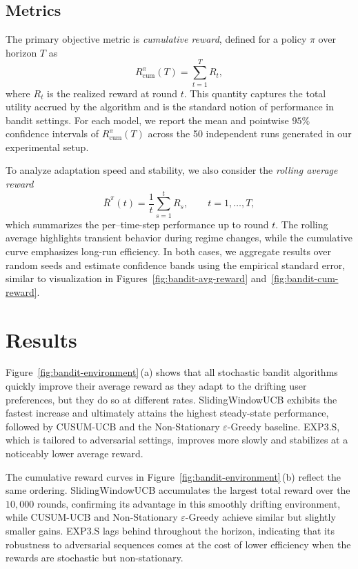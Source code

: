 \documentclass[pdflatex,sn-mathphys-num]{sn-jnl}
\theoremstyle{thmstyleone}%
\theoremstyle{thmstyletwo}%
\theoremstyle{thmstylethree}%
\begin{document}
\FloatBarrier

\subsection{Metrics}\label{sec3-3}

The primary objective metric is \emph{cumulative reward}, defined for a policy
\(\pi\) over horizon \(T\) as
\[
R_{\text{cum}}^\pi(T)
=
\sum_{t=1}^{T} R_t,
\]
where \(R_t\) is the realized reward at round \(t\). This quantity captures the
total utility accrued by the algorithm and is the standard notion of
performance in bandit settings. For each model, we report the mean and
pointwise \(95\%\) confidence intervals of \(R_{\text{cum}}^\pi(T)\) across the
50 independent runs generated in our experimental setup.\cite{swucb,epsilon_greedy_ns,cusumucb,exp3s}

To analyze adaptation speed and stability, we also consider the \emph{rolling
average reward}
\[
\bar{R}^\pi(t)
=
\frac{1}{t}\sum_{s=1}^{t} R_s,
\qquad t = 1,\dots,T,
\]
which summarizes the per–time-step performance up to round \(t\). The rolling
average highlights transient behavior during regime changes, while the
cumulative curve emphasizes long-run efficiency. In both cases, we aggregate
results over random seeds and estimate confidence bands using the empirical
standard error, similar to visualization in Figures~\ref{fig:bandit-avg-reward}
and~\ref{fig:bandit-cum-reward}.


\section{Results}\label{sec4}

Figure~\ref{fig:bandit-environment}\,(a) shows that all stochastic bandit algorithms
quickly improve their average reward as they adapt to the drifting user
preferences, but they do so at different rates. SlidingWindowUCB exhibits the
fastest increase and ultimately attains the highest steady-state performance,
followed by CUSUM-UCB and the Non-Stationary \(\varepsilon\)-Greedy baseline.
EXP3.S, which is tailored to adversarial settings, improves more slowly and
stabilizes at a noticeably lower average reward.

The cumulative reward curves in Figure~\ref{fig:bandit-environment}\,(b) reflect
the same ordering. SlidingWindowUCB accumulates the largest total reward over
the \(10{,}000\) rounds, confirming its advantage in this smoothly drifting
environment, while CUSUM-UCB and Non-Stationary \(\varepsilon\)-Greedy achieve
similar but slightly smaller gains. EXP3.S lags behind throughout the horizon,
indicating that its robustness to adversarial sequences comes at the cost of
lower efficiency when the rewards are stochastic but non-stationary.
\end{document}
